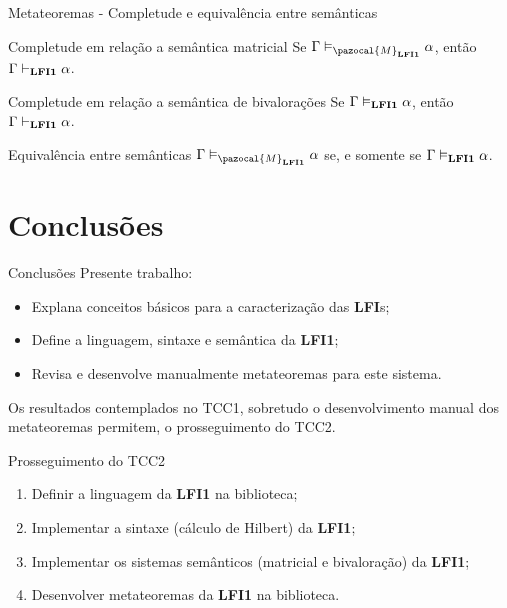\documentclass[table]{beamer}
\newcommand{\lfium}{{\normalfont\textbf{LFI1}}}
\newcommand{\lfis}{{\normalfont\textbf{LFI}s}}
\newcommand{\conmat}{\vDash_{\pazocal{M}_{\lfium{}}}}
\newcommand{\conval}{\vDash_{\lfium{}}}
\newcommand{\conhil}{\vdash_{\lfium{}}}
\begin{document}
    \begin{frame}{Metateoremas {-} Completude e equivalência entre semânticas}
        \begin{block}{Completude em relação a semântica matricial}
            Se $\Gamma \conmat \alpha$, então $\Gamma \conhil \alpha$.
        \end{block}

        \begin{block}{Completude em relação a semântica de bivalorações}
           Se $\Gamma \conval \alpha$, então $\Gamma \conhil \alpha$.
        \end{block}

        \begin{block}{Equivalência entre semânticas}
            $\Gamma \conmat \alpha$ se, e somente se $\Gamma \conval \alpha$.
        \end{block}
    \end{frame}
        

\section[]{Conclusões}
    
    \begin{frame}{Conclusões}
        Presente trabalho:
        \begin{itemize}
            \item Explana conceitos básicos para a caracterização das \lfis{};
            \item Define a linguagem, sintaxe e semântica da \lfium{};
            \item Revisa e desenvolve manualmente metateoremas para este sistema.
        \end{itemize}
        Os resultados contemplados no TCC1, sobretudo o desenvolvimento manual dos metateoremas permitem, o prosseguimento do TCC2.
    \end{frame}

    \begin{frame}{Prosseguimento do TCC2}
        \begin{enumerate}
            \item Definir a linguagem da \lfium{} na biblioteca;
            \item Implementar a sintaxe (cálculo de Hilbert) da \lfium{};
            \item Implementar os sistemas semânticos (matricial e bivaloração) da \lfium{};
            \item Desenvolver metateoremas da \lfium{} na biblioteca.
        \end{enumerate}
    \end{frame}
\end{document}
